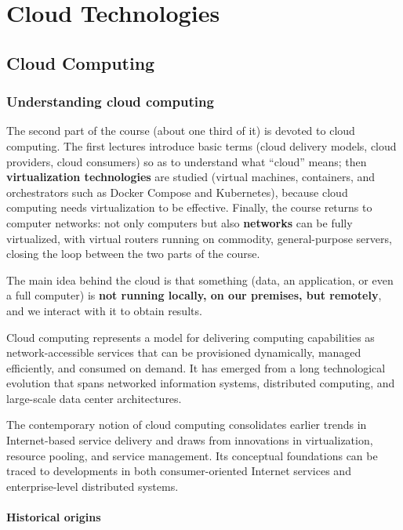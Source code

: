 \part{Cloud Technologies}

\chapter{Cloud Computing}

\section{Understanding cloud computing}

The second part of the course (about one third of it) is devoted to cloud computing. The first lectures introduce basic terms (cloud delivery models, cloud providers, cloud consumers) so as to understand what ``cloud'' means; then \textbf{virtualization technologies} are studied (virtual machines, containers, and orchestrators such as Docker Compose and Kubernetes), because cloud computing needs virtualization to be effective. Finally, the course returns to computer networks: not only computers but also \textbf{networks} can be fully virtualized, with virtual routers running on commodity, general-purpose servers, closing the loop between the two parts of the course.

The main idea behind the cloud is that something (data, an application, or even a full computer) is \textbf{not running locally, on our premises, but remotely}, and we interact with it to obtain results.

Cloud computing represents a model for delivering computing capabilities as network-accessible services that can be provisioned dynamically, managed efficiently, and consumed on demand. It has emerged from a long technological evolution that spans networked information systems, distributed computing, and large-scale data center architectures.

The contemporary notion of cloud computing consolidates earlier trends in Internet-based service delivery and draws from innovations in virtualization, resource pooling, and service management. Its conceptual foundations can be traced to developments in both consumer-oriented Internet services and enterprise-level distributed systems.

\subsection{Historical origins}

